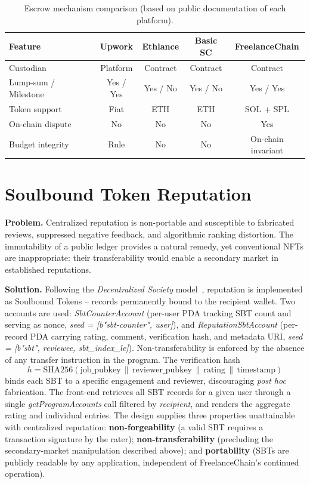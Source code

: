 \begin{table}[H]
\centering
\caption{Escrow mechanism comparison (based on public documentation of each platform).}
\label{table:escrow_comparison}
\small
\begin{tabular}{|l|c|c|c|c|}
\hline
\textbf{Feature} & \textbf{Upwork} & \textbf{Ethlance} & \textbf{Basic SC} & \textbf{FreelanceChain} \\ \hline
Custodian & Platform & Contract & Contract & Contract \\ \hline
Lump-sum / Milestone & Yes / Yes & Yes / No & Yes / No & Yes / Yes \\ \hline
Token support & Fiat & ETH & ETH & SOL + SPL \\ \hline
On-chain dispute & No & No & No & Yes \\ \hline
Budget integrity & Rule & No & No & On-chain invariant \\ \hline
\end{tabular}
\end{table}

\section{Soulbound Token Reputation}
\label{section:5.2}

\textbf{Problem.} Centralized reputation is non-portable and susceptible to fabricated reviews, suppressed negative feedback, and algorithmic ranking distortion. The immutability of a public ledger provides a natural remedy, yet conventional NFTs are inappropriate: their transferability would enable a secondary market in established reputations.

\textbf{Solution.} Following the \emph{Decentralized Society} model~\cite{weyl2022decentralized}, reputation is implemented as Soulbound Tokens -- records permanently bound to the recipient wallet. Two accounts are used: \emph{SbtCounterAccount} (per-user PDA tracking SBT count and serving as nonce, \emph{seed = [b"sbt-counter", user]}), and \emph{ReputationSbtAccount} (per-record PDA carrying rating, comment, verification hash, and metadata URI, \emph{seed = [b"sbt", reviewee, sbt\_index\_le]}). Non-transferability is enforced by the absence of any transfer instruction in the program. The verification hash
\begin{equation}
    h = \text{SHA256}(\text{job\_pubkey} \,\|\, \text{reviewer\_pubkey} \,\|\, \text{rating} \,\|\, \text{timestamp})
\end{equation}
\noindent binds each SBT to a specific engagement and reviewer, discouraging \emph{post hoc} fabrication. The front-end retrieves all SBT records for a given user through a single \emph{getProgramAccounts} call filtered by \emph{recipient}, and renders the aggregate rating and individual entries. The design supplies three properties unattainable with centralized reputation: \textbf{non-forgeability} (a valid SBT requires a transaction signature by the rater); \textbf{non-transferability} (precluding the secondary-market manipulation described above); and \textbf{portability} (SBTs are publicly readable by any application, independent of FreelanceChain's continued operation).

